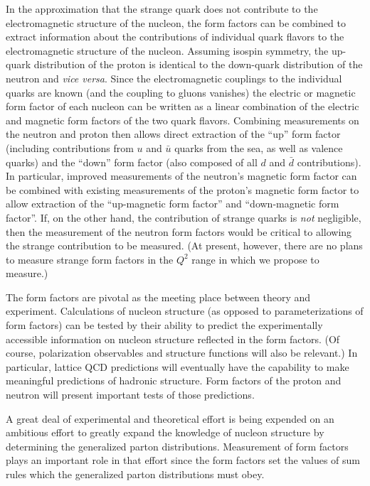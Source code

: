 \documentclass[12pt,letterpaper,oneside]{article}
\begin{document}
In the approximation that the strange quark does not contribute to the
electromagnetic structure of the nucleon, the form factors can be
combined \cite{qf1,qf2,qf3}
to extract information about  the contributions of individual
quark flavors to the electromagnetic structure of the nucleon.
Assuming isospin symmetry, the up-quark distribution of the proton is
identical to the down-quark distribution of the neutron and {\it vice
  versa}. Since the electromagnetic couplings to the individual quarks
are known (and the coupling to gluons vanishes) the electric or
magnetic form factor of each nucleon can be written as a linear
combination of the electric and magnetic form factors of the two quark
flavors.  Combining measurements on the neutron and proton then allows
direct extraction of the ``up'' form factor (including contributions
from $u$ and $\bar u$ quarks from the sea, as well as valence quarks)
and the ``down'' form factor (also composed of all $d$ and $\bar d$ 
contributions).  In particular, improved measurements of the neutron's
magnetic form factor can be combined with existing measurements of the
proton's magnetic form factor to allow extraction of the ``up-magnetic
form factor'' and ``down-magnetic form factor''.  If, on the other
hand, the contribution of strange quarks is {\em not} negligible, then
the measurement of the neutron form factors would be critical to allowing
the strange contribution to be measured. (At present, however, there
are no plans to measure strange form factors in the $Q^2$ range in
which we propose to measure.)


The form factors are pivotal as the meeting place between theory and experiment. 
Calculations of nucleon structure (as opposed to parameterizations of form factors) can be
tested by their ability to predict the experimentally accessible
information on nucleon structure reflected in the form factors.  (Of
course, polarization observables and structure functions will also be
relevant.)  In particular, lattice QCD predictions will eventually
have the capability to make meaningful predictions of hadronic
structure.  Form factors of the proton and neutron will present
important tests of those predictions.



A great deal of experimental and theoretical effort
\cite{GPD1,GPD2,GPD3} is being expended
on an ambitious effort to greatly expand the knowledge of nucleon
structure by determining the generalized parton distributions.
Measurement of form factors plays an important role in that effort
since the form factors set the values of sum rules which the generalized parton
distributions must obey.
\end{document}
